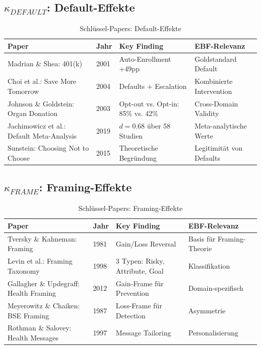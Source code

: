 \subsection{$\kappa_{DEFAULT}$: Default-Effekte}

\begin{table}[htbp]
\centering
\caption{Schlüssel-Papers: Default-Effekte}
\label{tab:dr-papers-default}
\renewcommand{\arraystretch}{1.2}
\scriptsize
\begin{tabular}{@{}p{3.5cm}p{2cm}p{4cm}p{3cm}@{}}
\toprule
\textbf{Paper} & \textbf{Jahr} & \textbf{Key Finding} & \textbf{EBF-Relevanz} \\
\midrule
Madrian \& Shea: 401(k) & 2001 & Auto-Enrollment +49pp & Goldstandard Default \\
Choi et al.: Save More Tomorrow & 2004 & Defaults + Escalation & Kombinierte Intervention \\
Johnson \& Goldstein: Organ Donation & 2003 & Opt-out vs. Opt-in: 85\% vs. 42\% & Cross-Domain Validity \\
Jachimowicz et al.: Default Meta-Analysis & 2019 & $d = 0.68$ über 58 Studien & Meta-analytische Werte \\
Sunstein: Choosing Not to Choose & 2015 & Theoretische Begründung & Legitimität von Defaults \\
\bottomrule
\end{tabular}
\end{table}

\subsection{$\kappa_{FRAME}$: Framing-Effekte}

\begin{table}[htbp]
\centering
\caption{Schlüssel-Papers: Framing-Effekte}
\label{tab:dr-papers-frame}
\renewcommand{\arraystretch}{1.2}
\scriptsize
\begin{tabular}{@{}p{3.5cm}p{2cm}p{4cm}p{3cm}@{}}
\toprule
\textbf{Paper} & \textbf{Jahr} & \textbf{Key Finding} & \textbf{EBF-Relevanz} \\
\midrule
Tversky \& Kahneman: Framing & 1981 & Gain/Loss Reversal & Basis für Framing-Theorie \\
Levin et al.: Framing Taxonomy & 1998 & 3 Typen: Risky, Attribute, Goal & Klassifikation \\
Gallagher \& Updegraff: Health Framing & 2012 & Gain-Frame für Prevention & Domain-spezifisch \\
Meyerowitz \& Chaiken: BSE Framing & 1987 & Loss-Frame für Detection & Asymmetrie \\
Rothman \& Salovey: Health Messages & 1997 & Message Tailoring & Personalisierung \\
\bottomrule
\end{tabular}
\end{table}

